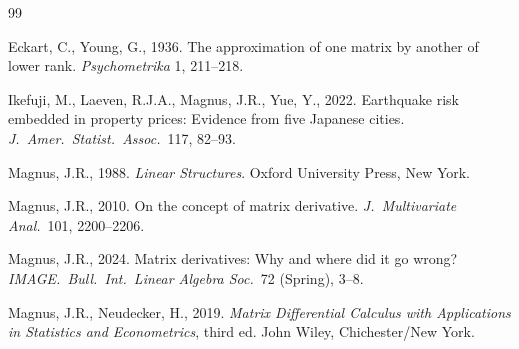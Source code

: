 \documentclass[12pt,a4paper]{article}
\theoremstyle{definition}
\begin{document}
\begin{thebibliography}{99}

Eckart, C., Young, G., 1936. The approximation of one matrix by another of lower rank. \emph{Psychometrika} 1, 211--218. %

Ikefuji, M., Laeven, R.J.A., Magnus, J.R., Yue, Y., 2022. Earthquake risk embedded in property prices: Evidence from five Japanese cities. \emph{J.\ Amer.\ Statist.\ Assoc.}\ 117, 82--93. %

Magnus, J.R., 1988. \emph{Linear Structures}. Oxford University Press, New York. %

Magnus, J.R., 2010. On the concept of matrix derivative. \emph{J.\ Multivariate Anal.}\ 101, 2200--2206. %

Magnus, J.R., 2024. Matrix derivatives: Why and where did it go wrong? \emph{IMAGE.\ Bull.\ Int.\ Linear Algebra Soc.}\ 72 (Spring), 3--8. %

Magnus, J.R., Neudecker, H., 2019. \emph{Matrix Differential Calculus with Applications in Statistics and Econometrics}, third ed. John Wiley, Chichester/New York. %

\end{thebibliography}
\end{document}

